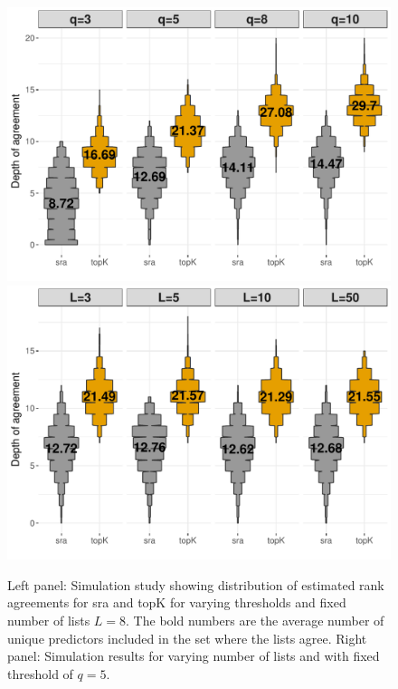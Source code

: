 \documentclass[oupdraft]{bio}
\begin{document}
\begin{figure}[htbp]
   \begin{center}
 \includegraphics[width=.49\textwidth]{Ksim.pdf}
 \includegraphics[width=.49\textwidth]{Lsim}
 \end{center}
 \caption{Left panel: Simulation study showing distribution of
   estimated rank agreements for sra and topK for varying thresholds
   and fixed number of lists $L=8$. The bold numbers are the average
   number of unique predictors included in the set where the lists
   agree. Right panel: Simulation results for varying number of lists
   and with fixed threshold of $q=5$.}
 \label{fig:example99}
\end{figure}




\newpage
\end{document}
